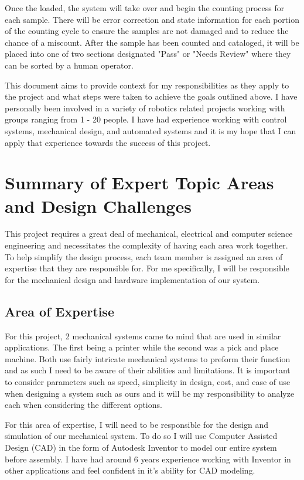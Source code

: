 \documentclass[11pt]{article}
\begin{document}
Once the loaded, the system will take over and begin the counting process for each sample. There will be error correction and state information for each portion of the counting cycle to ensure the samples are not damaged and to reduce the chance of a miscount. After the sample has been counted and cataloged, it will be placed into one of two sections designated "Pass" or "Needs Review" where they can be sorted by a human operator. 



This document aims to provide context for my responsibilities as they apply to the project and what steps were taken to achieve the goals outlined above. I have personally been involved in a variety of robotics related projects working with groups ranging from 1 - 20 people. I have had experience working with control systems, mechanical design, and automated systems and it is my hope that I can apply that experience towards the success of this project. 

\section{Summary of Expert Topic Areas and Design Challenges}

This project requires a great deal of mechanical, electrical and computer science engineering and necessitates the complexity of having each area work together. To help simplify the design process, each team member is assigned an area of expertise that they are responsible for. For me specifically, I will be responsible for the mechanical design and hardware implementation of our system. 

\subsection{Area of Expertise}

For this project, 2 mechanical systems came to mind that are used in similar applications. The first being a printer while the second was a pick and place machine. Both use fairly intricate mechanical systems to preform their function and as such I need to be aware of their abilities and limitations. It is important to consider parameters such as speed, simplicity in design, cost, and ease of use when designing a system such as ours and it will be my responsibility to analyze each when considering the different options. 

For this area of expertise, I will need to be responsible for the design and simulation of our mechanical system. To do so I will use Computer Assisted Design (CAD) in the form of Autodesk Inventor to model our entire system before assembly. I have had around 6 years experience working with Inventor in other applications and feel confident in it's ability for CAD modeling. 
\end{document}
